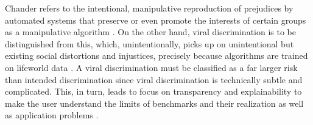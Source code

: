 \documentclass[manuscript,screen]{acmart}
\begin{document}
Chander refers to the intentional, manipulative reproduction of prejudices by automated systems that preserve or even promote the interests of certain groups as a manipulative algorithm \citep{chander2017racist}. On the other hand, viral discrimination is to be distinguished from this, which, unintentionally, picks up on unintentional but existing social distortions and injustices, precisely because algorithms are trained on lifeworld data \citep{chander2017racist}. A viral discrimination must be classified as a far larger risk than intended discrimination since viral discrimination is technically subtle and complicated. This, in turn, leads to focus on transparency and explainability to make the user understand the limits of benchmarks and their realization as well as  application problems \citep{almeida2021ethics}.
\end{document}
